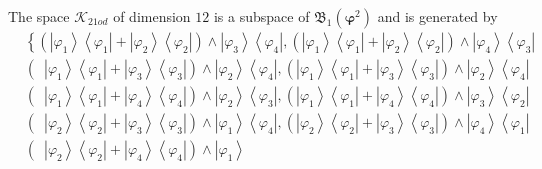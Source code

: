 \documentclass[aps,preprint]{revtex4}%
\begin{document}
The space $\mathcal{K}_{21od}$ of dimension $12$ is a subspace of
$\mathfrak{B}_{1}\left(  \mathbf{\varphi}^{2}\right)  $ and is generated by
\begin{align}
&  \left\{  \left(  \left\vert \varphi_{1}\right\rangle \left\langle
\varphi_{1}\right\vert +\left\vert \varphi_{2}\right\rangle \left\langle
\varphi_{2}\right\vert \right)  \wedge\left\vert \varphi_{3}\right\rangle
\left\langle \varphi_{4}\right\vert ,\left(  \left\vert \varphi_{1}%
\right\rangle \left\langle \varphi_{1}\right\vert +\left\vert \varphi
_{2}\right\rangle \left\langle \varphi_{2}\right\vert \right)  \wedge
\left\vert \varphi_{4}\right\rangle \left\langle \varphi_{3}\right\vert
\right. \nonumber\\
&  \left(  \,\,\,\left\vert \varphi_{1}\right\rangle \left\langle \varphi
_{1}\right\vert +\left\vert \varphi_{3}\right\rangle \left\langle \varphi
_{3}\right\vert \right)  \wedge\left\vert \varphi_{2}\right\rangle
\left\langle \varphi_{4}\right\vert ,\left(  \left\vert \varphi_{1}%
\right\rangle \left\langle \varphi_{1}\right\vert +\left\vert \varphi
_{3}\right\rangle \left\langle \varphi_{3}\right\vert \right)  \wedge
\left\vert \varphi_{2}\right\rangle \left\langle \varphi_{4}\right\vert
\nonumber\\
&  \left(  \,\,\,\left\vert \varphi_{1}\right\rangle \left\langle \varphi
_{1}\right\vert +\left\vert \varphi_{4}\right\rangle \left\langle \varphi
_{4}\right\vert \right)  \wedge\left\vert \varphi_{2}\right\rangle
\left\langle \varphi_{3}\right\vert ,\left(  \left\vert \varphi_{1}%
\right\rangle \left\langle \varphi_{1}\right\vert +\left\vert \varphi
_{4}\right\rangle \left\langle \varphi_{4}\right\vert \right)  \wedge
\left\vert \varphi_{3}\right\rangle \left\langle \varphi_{2}\right\vert
\nonumber\\
&  \left(  \,\,\,\left\vert \varphi_{2}\right\rangle \left\langle \varphi
_{2}\right\vert +\left\vert \varphi_{3}\right\rangle \left\langle \varphi
_{3}\right\vert \right)  \wedge\left\vert \varphi_{1}\right\rangle
\left\langle \varphi_{4}\right\vert ,\left(  \left\vert \varphi_{2}%
\right\rangle \left\langle \varphi_{2}\right\vert +\left\vert \varphi
_{3}\right\rangle \left\langle \varphi_{3}\right\vert \right)  \wedge
\left\vert \varphi_{4}\right\rangle \left\langle \varphi_{1}\right\vert
\nonumber\\
&  \left(  \,\,\,\left\vert \varphi_{2}\right\rangle \left\langle \varphi
_{2}\right\vert +\left\vert \varphi_{4}\right\rangle \left\langle \varphi
_{4}\right\vert \right)  \wedge\left\vert \varphi_{1}\right\rangle

\end{align}
\end{document}
